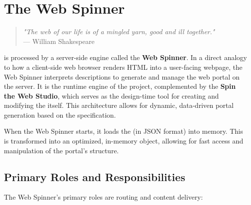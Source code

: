 
\chapter{The Web Spinner}
\label{chap:web-spinner}

\begin{quote}
	\textit{"The web of our life is of a mingled yarn, good and ill together."} \\
— William Shakespeare
\end{quote}

\wbdl{} is processed by a server-side engine called the \textbf{Web Spinner}. In a direct analogy to how a client-side web browser renders HTML into a user-facing webpage, the Web Spinner interprets \wbdl{} descriptions to generate and manage the web portal on the server. It is the runtime engine of the project, complemented by the \textbf{Spin the Web Studio}, which serves as the design-time tool for creating and modifying the \webbase{} itself. This architecture allows for dynamic, data-driven portal generation based on the \wbdl{} specification.

When the Web Spinner starts, it loads the \webbase{} (in JSON format) into memory. This \webbase{} is transformed into an optimized, in-memory object, allowing for fast access and manipulation of the portal's structure.

\section{Primary Roles and Responsibilities}
\label{sec:primary-roles}

The Web Spinner's primary roles are routing and content delivery:


